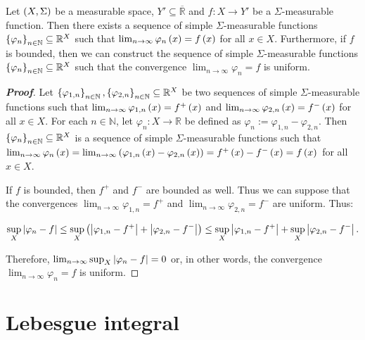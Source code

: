 \begin{corollary}
  Let $\left(X,\Sigma\right)$ be a measurable space, $Y'\subseteq\overline{\mathbb{R}}$ and $f:X\rightarrow Y'$ be a $\Sigma$-measurable function. Then there exists a sequence of simple $\Sigma$-measurable functions $\left\{\varphi_n\right\}_{n\in\mathbb{N}}\subseteq\mathbb{R}^X$ such that $\lim_{n\to\infty}{\varphi_n\left(x\right)}=f\left(x\right)$ for all $x\in X$. Furthermore, if $f$ is bounded, then we can construct the sequence of simple $\Sigma$-measurable functions $\left\{\varphi_n\right\}_{n\in\mathbb{N}}\subseteq\mathbb{R}^X$ such that the convergence $\lim_{n\to\infty}{\varphi_n}=f$ is uniform.
  \begin{proof}[\rm\textbf{Proof}]
    \rm Let $\left\{\varphi_{1,n}\right\}_{n\in\mathbb{N}},\left\{\varphi_{2,n}\right\}_{n\in\mathbb{N}}\subseteq\mathbb{R}^X$ be two sequences of simple $\Sigma$-measurable functions such that $\lim_{n\to\infty}{\varphi_{1,n}\left(x\right)}=f^+\left(x\right)$ and $\lim_{n\to\infty}{\varphi_{2,n}\left(x\right)}=f^-\left(x\right)$ for all $x\in X$. For each $n\in\mathbb{N}$, let $\varphi_n:X\rightarrow\mathbb{R}$ be defined as $\varphi_n:=\varphi_{1,n}-\varphi_{2,n}$. Then $\left\{\varphi_n\right\}_{n\in\mathbb{N}}\subseteq\mathbb{R}^X$ is a sequence of simple $\Sigma$-measurable functions such that $\lim_{n\to\infty}{\varphi_n\left(x\right)}=\lim_{n\to\infty}{\left(\varphi_{1,n}\left(x\right)-\varphi_{2,n}\left(x\right)\right)}=f^+\left(x\right)-f^-\left(x\right)=f\left(x\right)$ for all $x\in X$.

    If $f$ is bounded, then $f^+$ and $f^-$ are bounded as well. Thus we can suppose that the convergences $\lim_{n\to\infty}{\varphi_{1,n}}=f^+$ and $\lim_{n\to\infty}{\varphi_{2,n}}=f^-$ are uniform. Thus:

    \begin{equation}
      \sup_X{\left|\varphi_n-f\right|}\leq\sup_X\left(\left|\varphi_{1,n}-f^+\right|+\left|\varphi_{2,n}-f^-\right|\right)\leq\sup_X\left|\varphi_{1,n}-f^+\right|+\sup_X\left|\varphi_{2,n}-f^-\right|.
    \end{equation}
    
    Therefore, $\lim_{n\to\infty}{\sup_{X}{\left|\varphi_n-f\right|}}=0$ or, in other words, the convergence $\lim_{n\to\infty}{\varphi_n}=f$ is uniform.
  \end{proof}
\end{corollary}
\section{Lebesgue integral}

